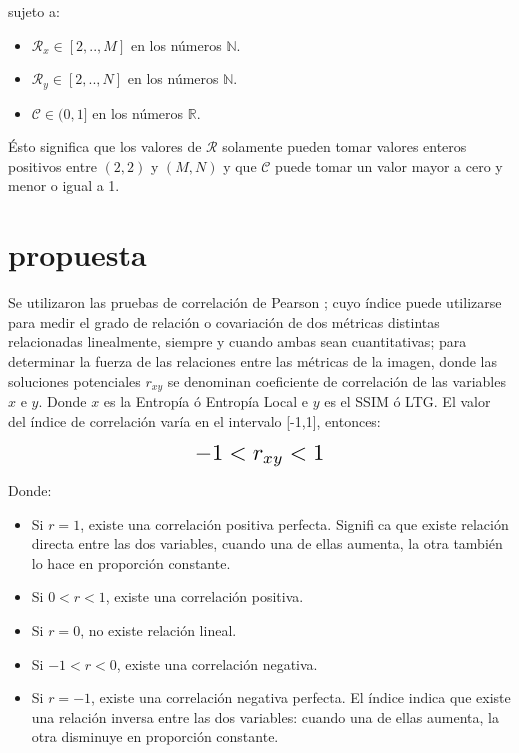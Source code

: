 \documentclass[spanish,twocolumn]{article}
\begin{document}
sujeto a:

\begin{itemize}
\item $\mathcal{R}_x \in [2,..,M]$ en los números $\mathbb{N}$.
\item $\mathcal{R}_y \in [2,..,N]$ en los números $\mathbb{N}$.
\item $\mathscr{C} \in (0,1]$ en los números $\mathbb{R}$.
\end{itemize}

Ésto significa que los valores de $\mathcal{R}$ solamente pueden tomar valores enteros positivos entre $(2,2)$ y $(M,N)$ y que $\mathscr{C}$ puede tomar un valor mayor a cero y menor o igual a 1.

\section{propuesta}
\label{sec:propuesta}
Se utilizaron las pruebas de correlación de Pearson \cite{correlacion}; cuyo índice puede utilizarse para medir el grado de relación o covariación de dos métricas distintas relacionadas linealmente,  siempre y cuando ambas sean cuantitativas; para determinar la fuerza de las relaciones entre las métricas de la imagen, donde las soluciones potenciales $r_{xy}$ se denominan coeficiente de correlación de las variables $x$ e $y$. Donde $x$ es la Entropía ó Entropía Local e $y$ es el SSIM ó LTG. El valor del  índice de correlación varía en el intervalo [-1,1], entonces:

\begin{equation}\label{eq:gm}
\resizebox{.3\hsize}{!}
{
$-1<r_{xy}<1$ 
}
\end{equation}

Donde:
\begin{itemize}
\item Si $r = 1$, existe una correlación positiva perfecta. Significa que existe relación directa entre las dos variables, cuando una de ellas aumenta, la otra también lo hace en proporción constante.	
\item Si $0<r<1$, existe una correlación positiva.
\item Si $r = 0$, no existe relación lineal.
\item Si $-1<r<0$, existe una correlación negativa.
\item Si $r = -1$, existe una correlación negativa perfecta. El índice indica que existe una relación inversa entre las dos variables: cuando una de ellas aumenta, la otra disminuye en proporción constante.
\end{itemize}
\end{document}
